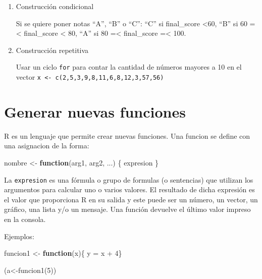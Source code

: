 \documentclass[
]{book}
\newenvironment{Shaded}{\begin{snugshade}}{\end{snugshade}}
\newcommand{\ControlFlowTok}[1]{\textcolor[rgb]{0.13,0.29,0.53}{\textbf{#1}}}
\newcommand{\DecValTok}[1]{\textcolor[rgb]{0.00,0.00,0.81}{#1}}
\newcommand{\FunctionTok}[1]{\textcolor[rgb]{0.00,0.00,0.00}{#1}}
\newcommand{\NormalTok}[1]{#1}
\newcommand{\OtherTok}[1]{\textcolor[rgb]{0.56,0.35,0.01}{#1}}
\newcommand{\SpecialCharTok}[1]{\textcolor[rgb]{0.00,0.00,0.00}{#1}}
\begin{document}
\begin{enumerate}
\def\labelenumi{\arabic{enumi}.}
\item
  Construcción condicional

  Si se quiere poner notas ``A'', ``B'' o ``C'': ``C'' si final\_score \textless60, ``B'' si 60 =\textless{} final\_score \textless{} 80, ``A'' si 80 =\textless{} final\_score =\textless{} 100.
\item
  Construcción repetitiva

  Usar un ciclo \texttt{for} para contar la cantidad de números mayores a 10 en el vector \texttt{x\ \textless{}-\ c(2,5,3,9,8,11,6,8,12,3,57,56)}
\end{enumerate}

\hypertarget{generar-nuevas-funciones}{%
\chapter{Generar nuevas funciones}\label{generar-nuevas-funciones}}

R es un lenguaje que permite crear nuevas funciones. Una funcion se define con una asignacion de la forma:

\begin{Shaded}
\begin{Highlighting}[]
\NormalTok{nombre }\OtherTok{\textless{}{-}} \ControlFlowTok{function}\NormalTok{(arg1, arg2, ...) \{}
\NormalTok{   expresion}
\NormalTok{ \}}
\end{Highlighting}
\end{Shaded}

La \texttt{expresion} es una fórmula o grupo de formulas (o sentencias) que utilizan los argumentos para calcular uno o varios valores. El resultado de dicha expresión es el valor que proporciona R en su salida y este puede ser un número, un vector, un gráfico, una lista y/o un mensaje. Una función devuelve el último valor impreso en la consola.

Ejemplos:

\begin{Shaded}
\begin{Highlighting}[]
\NormalTok{funcion1 }\OtherTok{\textless{}{-}} \ControlFlowTok{function}\NormalTok{(x)\{ y }\OtherTok{=}\NormalTok{ x }\SpecialCharTok{+} \DecValTok{4}\NormalTok{\}}

\NormalTok{(a}\OtherTok{\textless{}{-}}\FunctionTok{funcion1}\NormalTok{(}\DecValTok{5}\NormalTok{))}
\end{Highlighting}
\end{Shaded}
\end{document}
